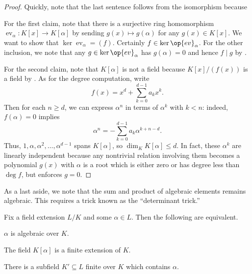 \documentclass[../notes.tex]{subfiles}
\begin{document}
\begin{proof}
	Quickly, note that the last sentence follows from the isomorphism because 
	
	For the first claim, note that there is a surjective ring homomorphism $\operatorname{ev}_\alpha\colon K[x]\to K[\alpha]$ by sending $g(x)\mapsto g(\alpha)$ for any $g(x)\in K[x]$. We want to show that $\ker{\operatorname{ev}_\alpha}=(f)$. Certainly $f\in\ker\op{ev}_\alpha$. For the other inclusion, we note that any $g\in\ker\op{ev}_\alpha$ has $g(\alpha)=0$ and hence $f\mid g$ by .

	For the second claim, note that $K[\alpha]$ is not a field because $K[x]/(f(x))$ is a field by . As for the degree computation, write
	\[f(x)=x^d+\sum_{k=0}^{d-1}a_kx^k.\]
	Then for each $n\ge d$, we can express $\alpha^n$ in terms of $\alpha^k$ with $k<n$: indeed, $f(\alpha)=0$ implies
	\[\alpha^n=-\sum_{k=0}^{d-1}a_k\alpha^{k+n-d}.\]
	Thus, $1,\alpha,\alpha^2,\ldots,\alpha^{d-1}$ spans $K[\alpha]$, so $\dim_KK[\alpha]\le d$. In fact, these $\alpha^k$ are linearly independent because any nontrivial relation involving them becomes a polynomial $g(x)$ with $\alpha$ is a root which is either zero or has degree less than $\deg f$, but  enforces $g=0$.
\end{proof}
As a last aside, we note that the sum and product of algebraic elements remains algebraic. This requires a trick known as the ``determinant trick.''
\begin{proposition} \label{prop:how-to-algebraic}
	Fix a field extension $L/K$ and some $\alpha\in L$. Then the following are equivalent.
	\begin{listalph}
		\item $\alpha$ is algebraic over $K$.
		\item The field $K[\alpha]$ is a finite extension of $K$.
		\item There is a subfield $K'\subseteq L$ finite over $K$ which contains $\alpha$.
	\end{listalph}
\end{proposition}
\end{document}
